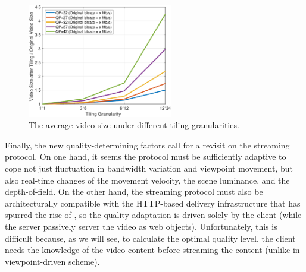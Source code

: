 \begin{figure}
  \centering
  \includegraphics[width=2.5in]{images/bitrateefficiency.eps}
  \caption{The average video size under different tiling granularities. }
  \label{fig:bitrate-efficiency}
  \end{figure}

Finally, the new quality-determining factors call for a revisit on the streaming protocol. 
On one hand, it seems the protocol must be sufficiently adaptive to cope not just fluctuation in bandwidth variation and viewpoint movement, but also real-time changes of the movement velocity, the scene luminance, and the depth-of-field. 
On the other hand, the streaming protocol must also be architecturally compatible with the HTTP-based delivery infrastructure that has spurred the rise of \vrvideos, so the quality adaptation is driven solely by the client (while the server passively server the video as web objects). 
Unfortunately, this is difficult because, as we will see, to calculate the optimal quality level, the client needs the knowledge of the video content before streaming the content (unlike in viewpoint-driven scheme). 




